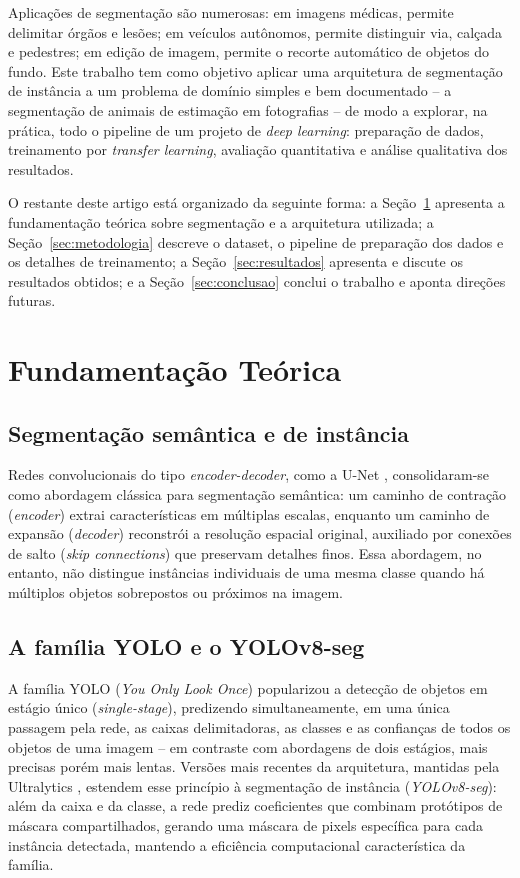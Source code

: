 \documentclass[12pt]{article}
\begin{document}
Aplicações de segmentação são numerosas: em imagens médicas, permite delimitar órgãos e
lesões; em veículos autônomos, permite distinguir via, calçada e pedestres; em edição de
imagem, permite o recorte automático de objetos do fundo. Este trabalho tem como objetivo
aplicar uma arquitetura de segmentação de instância a um problema de domínio simples e bem
documentado -- a segmentação de animais de estimação em fotografias -- de modo a explorar,
na prática, todo o pipeline de um projeto de \textit{deep learning}: preparação de dados,
treinamento por \textit{transfer learning}, avaliação quantitativa e análise qualitativa dos
resultados.

O restante deste artigo está organizado da seguinte forma: a Seção~\ref{sec:teoria} apresenta
a fundamentação teórica sobre segmentação e a arquitetura utilizada; a
Seção~\ref{sec:metodologia} descreve o dataset, o pipeline de preparação dos dados e os
detalhes de treinamento; a Seção~\ref{sec:resultados} apresenta e discute os resultados
obtidos; e a Seção~\ref{sec:conclusao} conclui o trabalho e aponta direções futuras.


\section{Fundamentação Teórica}
\label{sec:teoria}

\subsection{Segmentação semântica e de instância}

Redes convolucionais do tipo \textit{encoder-decoder}, como a U-Net \cite{ronneberger2015unet},
consolidaram-se como abordagem clássica para segmentação semântica: um caminho de
contração (\textit{encoder}) extrai características em múltiplas escalas, enquanto um
caminho de expansão (\textit{decoder}) reconstrói a resolução espacial original, auxiliado
por conexões de salto (\textit{skip connections}) que preservam detalhes finos. Essa
abordagem, no entanto, não distingue instâncias individuais de uma mesma classe quando há
múltiplos objetos sobrepostos ou próximos na imagem.

\subsection{A família YOLO e o YOLOv8-seg}

A família YOLO (\textit{You Only Look Once}) \cite{redmon2016yolo} popularizou a detecção de
objetos em estágio único (\textit{single-stage}), predizendo simultaneamente, em uma única
passagem pela rede, as caixas delimitadoras, as classes e as confianças de todos os objetos
de uma imagem -- em contraste com abordagens de dois estágios, mais precisas porém mais
lentas. Versões mais recentes da arquitetura, mantidas pela Ultralytics
\cite{ultralytics2023yolov8}, estendem esse princípio à segmentação de instância
(\textit{YOLOv8-seg}): além da caixa e da classe, a rede prediz coeficientes que combinam
protótipos de máscara compartilhados, gerando uma máscara de pixels específica para cada
instância detectada, mantendo a eficiência computacional característica da família.
\end{document}

